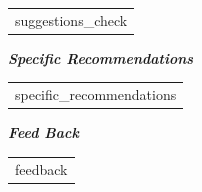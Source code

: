 \documentclass[11pt,a4paper]{letter} %
\begin{document}
\begin{letter}
\begin{center}
\begin{tabular}{  p{13.5cm}  }
   {{suggestions_check}}  \\
    \end{tabular}
\end{center}
\hspace{1.1cm}\textbf{\textit{Specific Recommendations}}
\begin{center}
     \begin{tabular}{  p{13.5cm}  }
  
    {{specific_recommendations}}  \\
    \end{tabular}
\end{center}
\hspace{1.1cm}\textbf{\textit{Feed Back}}
\begin{center}
     \begin{tabular}{  p{13.5cm}  }
  
    {{feedback}}  \\
    \end{tabular}
\end{center}

\closing{} \\




\end{letter}
\end{document}

